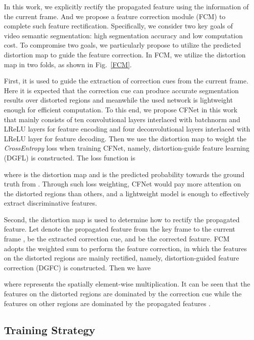 \documentclass[journal]{IEEEtran}
\begin{document}
In this work, we explicitly rectify the propagated feature using the information of the current frame.  And we propose a feature correction module (FCM) to complete such feature rectification. Specifically, we consider two key goals of video semantic segmentation: high segmentation accuracy and low computation cost. To compromise two goals, we particularly propose to utilize the predicted distortion map to guide the feature correction.
In FCM, we utilize the distortion map in two folds, as shown in Fig.~\ref{FCM}. 

First, it is used to guide the extraction of correction cues from the current frame. Here it is expected that the correction cue can produce accurate  segmentation results over distorted regions and meanwhile the used network is lightweight enough for efficient computation. To this end, we propose CFNet in this work that mainly consists of ten convolutional layers interlaced with batchnorm and LReLU layers for feature encoding and four deconvolutional layers interlaced with LReLU layer for feature decoding. Then we use the distortion map to weight the \textit{CrossEntropy} loss when training CFNet, namely, distortion-guide feature learning (DGFL) is constructed. The loss function is

where  is the distortion map and  is the predicted probability towards the ground truth from . Through such loss weighting, CFNet would pay more attention on the distorted regions than others, and a lightweight model is enough to effectively extract discriminative features.

Second, the distortion map is used to determine how to rectify the propagated feature. Let  denote the propagated feature from the key frame to the current frame ,    be the extracted correction cue, and  be the corrected feature. 
FCM adopts the weighted sum to perform the feature correction, in which the features on the distorted regions are mainly rectified,  namely, distortion-guided feature correction (DGFC) is constructed. Then we have

where  represents the spatially element-wise multiplication.
It can be seen that the features on the distorted regions are dominated by the correction cue  while the features on other regions are dominated by the propagated features .



\subsection{Training Strategy}
\end{document}
